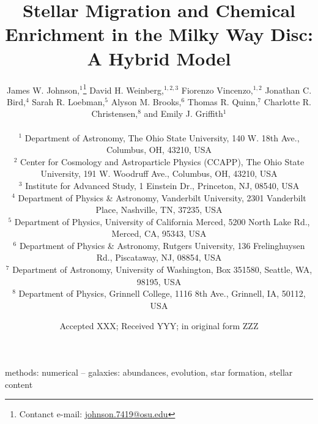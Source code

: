 \documentclass[felqn, usenatbib]{mnras}
\title[Stellar Migration and Chemical Enrichment]{Stellar Migration and 
Chemical Enrichment in the Milky Way Disc: A Hybrid Model}
\author[J.W. Johnson et al.]{James W. Johnson,$^{1}$\thanks{
	Contanct e-mail: \href{mailto:
	johnson.7419@osu.edu}{johnson.7419@osu.edu}} 
	David H. Weinberg,$^{1, 2, 3}$ 
	Fiorenzo Vincenzo,$^{1, 2}$ 
	Jonathan C. Bird,$^{4}$ 
	\newauthor 
	Sarah R. Loebman,$^{5}$ 
	Alyson M. Brooks,$^{6}$ 
	Thomas R. Quinn,$^{7}$ 
	Charlotte R. Christensen,$^{8}$ 
	\newauthor 
	and Emily J. Griffith$^{1}$ 
	\\ \null \\ 
	$^{1}$ Department of Astronomy, The Ohio State University, 
	140 W. 18th Ave., Columbus, OH, 43210, USA 
	\\ 
	$^{2}$ Center for Cosmology and Astroparticle Physics (CCAPP), 
	The Ohio State University, 191 W. Woodruff Ave., Columbus, OH, 43210, USA 
	\\ 
	$^{3}$ Institute for Advanced Study, 1 Einstein Dr., Princeton, NJ, 08540, 
	USA 
	\\ 
	$^{4}$ Department of Physics \& Astronomy, Vanderbilt University, 
	2301 Vanderbilt Place, Nashville, TN, 37235, USA 
	\\ 
	$^{5}$ Department of Physics, University of California Merced, 
	5200 North Lake Rd., Merced, CA, 95343, USA 
	\\ 
	$^{6}$ Department of Physics \& Astronomy, Rutgers University, 136 
	Frelinghuysen Rd., Piscataway, NJ, 08854, USA 
	\\ 
	$^{7}$ Department of Astronomy, University of Washington, Box 351580, 
	Seattle, WA, 98195, USA 
	\\ 
	$^{8}$ Department of Physics, Grinnell College, 1116 8th Ave., Grinnell, 
	IA, 50112, USA 
}
\date{Accepted XXX; Received YYY; in original form ZZZ}
\begin{document}
 
\label{firstpage} 
\pagerange{\pageref{firstpage}--\pageref{lastpage}} 
\maketitle 

 

\begin{keywords} 
methods: numerical -- galaxies: abundances, evolution, star formation, stellar 
content 
\end{keywords} 

 
 
 
 
 


\begin{appendices} 
 
 
 
\end{appendices} 

 
 

\label{lastpage} 
\end{document}
